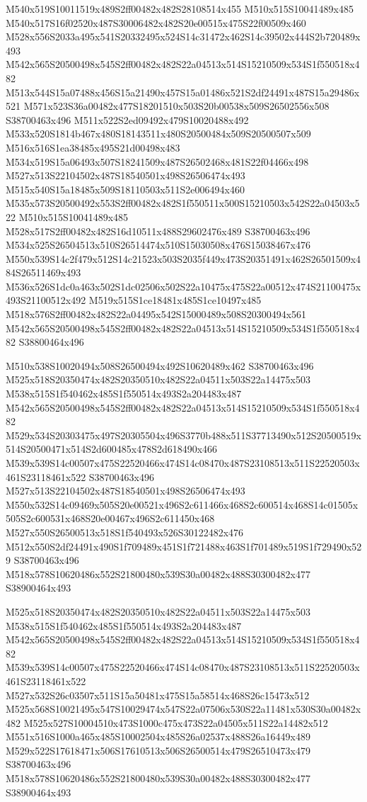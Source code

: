 \documentclass{article}
\begin{document}
\begin{multicols}{2}
M540x519S10011519x489S2ff00482x482S28108514x455 M510x515S10041489x485 M540x517S16f02520x487S30006482x482S20e00515x475S22f00509x460 M528x556S2033a495x541S20332495x524S14c31472x462S14c39502x444S2b720489x493 M542x565S20500498x545S2ff00482x482S22a04513x514S15210509x534S1f550518x482 M513x544S15a07488x456S15a21490x457S15a01486x521S2df24491x487S15a29486x521 M571x523S36a00482x477S18201510x503S20b00538x509S26502556x508 S38700463x496 M511x522S2ed09492x479S10020488x492 M533x520S1814b467x480S18143511x480S20500484x509S20500507x509 M516x516S1ea38485x495S21d00498x483 M534x519S15a06493x507S18241509x487S26502468x481S22f04466x498 M527x513S22104502x487S18540501x498S26506474x493 M515x540S15a18485x509S18110503x511S2e006494x460 M535x573S20500492x553S2ff00482x482S1f550511x500S15210503x542S22a04503x522 M510x515S10041489x485 M528x517S2ff00482x482S16d10511x488S29602476x489 S38700463x496 M534x525S26504513x510S26514474x510S15030508x476S15038467x476 M550x539S14c2f479x512S14c21523x503S2035f449x473S20351491x462S26501509x484S26511469x493 M536x526S1dc0a463x502S1dc02506x502S22a10475x475S22a00512x474S21100475x493S21100512x492 M519x515S1ce18481x485S1ce10497x485 M518x576S2ff00482x482S22a04495x542S15000489x508S20300494x561 M542x565S20500498x545S2ff00482x482S22a04513x514S15210509x534S1f550518x482 S38800464x496

M510x538S10020494x508S26500494x492S10620489x462 S38700463x496 M525x518S20350474x482S20350510x482S22a04511x503S22a14475x503 M538x515S1f540462x485S1f550514x493S2a204483x487 M542x565S20500498x545S2ff00482x482S22a04513x514S15210509x534S1f550518x482 M529x534S20303475x497S20305504x496S3770b488x511S37713490x512S20500519x514S20500471x514S2d600485x478S2d618490x466 M539x539S14c00507x475S22520466x474S14c08470x487S23108513x511S22520503x461S23118461x522 S38700463x496 M527x513S22104502x487S18540501x498S26506474x493 M550x532S14c09469x505S20e00521x496S2c611466x468S2c600514x468S14c01505x505S2c600531x468S20e00467x496S2c611450x468 M527x550S26500513x518S1f540493x526S30122482x476 M512x550S2df24491x490S1f709489x451S1f721488x463S1f701489x519S1f729490x529 S38700463x496 M518x578S10620486x552S21800480x539S30a00482x488S30300482x477 S38900464x493

M525x518S20350474x482S20350510x482S22a04511x503S22a14475x503 M538x515S1f540462x485S1f550514x493S2a204483x487 M542x565S20500498x545S2ff00482x482S22a04513x514S15210509x534S1f550518x482 M539x539S14c00507x475S22520466x474S14c08470x487S23108513x511S22520503x461S23118461x522 M527x532S26c03507x511S15a50481x475S15a58514x468S26c15473x512 M525x568S10021495x547S10029474x547S22a07506x530S22a11481x530S30a00482x482 M525x527S10004510x473S1000c475x473S22a04505x511S22a14482x512 M551x516S1000a465x485S10002504x485S26a02537x488S26a16449x489 M529x522S17618471x506S17610513x506S26500514x479S26510473x479 S38700463x496 M518x578S10620486x552S21800480x539S30a00482x488S30300482x477 S38900464x493


\end{multicols}
\end{document}
